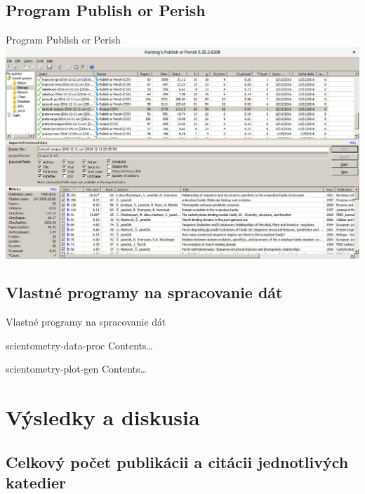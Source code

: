 \documentclass{beamer}
\begin{document}
\subsection{Program Publish or Perish}

%
%
\begin{frame}{Program Publish or Perish}
  \includegraphics[scale=0.255]{publish-or-perish_wine.png} \\[-1ex]
  \parbox{\textwidth}{\centering\tiny \citet{Harzing2011}}
\end{frame}


\subsection{Vlastné programy na spracovanie dát}

%
%
\begin{frame}{Vlastné programy na spracovanie dát}
  \begin{block}{scientometry-data-proc}
    Contents\dots
  \end{block}

  \begin{block}{scientometry-plot-gen}
    Contents\dots
  \end{block}
\end{frame}


\section{Výsledky a diskusia}

\subsection{Celkový počet publikácii a citácii jednotlivých katedier}
\end{document}

